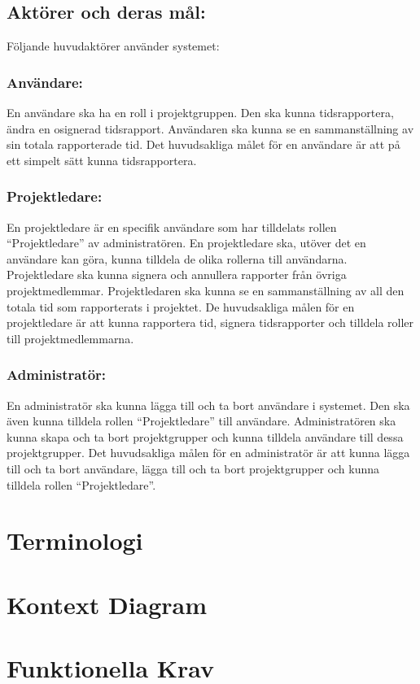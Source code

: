 \documentclass[paper=a4, fontsize=11pt,twoside]{article}
\begin{document}
\subsection{Aktörer och deras mål:}
Följande huvudaktörer använder systemet:
\subsubsection{Användare:}
En användare ska ha en roll i projektgruppen. Den ska kunna tidsrapportera, ändra en osignerad tidsrapport. Användaren ska kunna se en sammanställning av sin totala rapporterade tid. Det huvudsakliga målet för en användare är att på ett simpelt sätt kunna tidsrapportera.
\subsubsection{Projektledare:}
En projektledare är en specifik användare som har tilldelats rollen “Projektledare” av administratören. En projektledare ska, utöver det en användare kan göra, kunna tilldela de olika rollerna till användarna. Projektledare ska kunna signera och annullera rapporter från övriga projektmedlemmar. Projektledaren ska kunna se en sammanställning av all den totala tid som rapporterats i projektet. De huvudsakliga målen för en projektledare är att kunna rapportera tid, signera tidsrapporter och tilldela roller till projektmedlemmarna. 
\subsubsection{Administratör:}
En administratör ska kunna lägga till och ta bort användare i systemet. Den ska även kunna tilldela rollen “Projektledare” till användare. Administratören ska kunna skapa och ta bort projektgrupper och kunna tilldela användare till dessa projektgrupper. Det huvudsakliga målen för en administratör är att kunna lägga till och ta bort användare, lägga till och ta bort projektgrupper och kunna tilldela rollen “Projektledare”.

\section{Terminologi}
\section{Kontext Diagram}

\section{Funktionella Krav}
\end{document}
